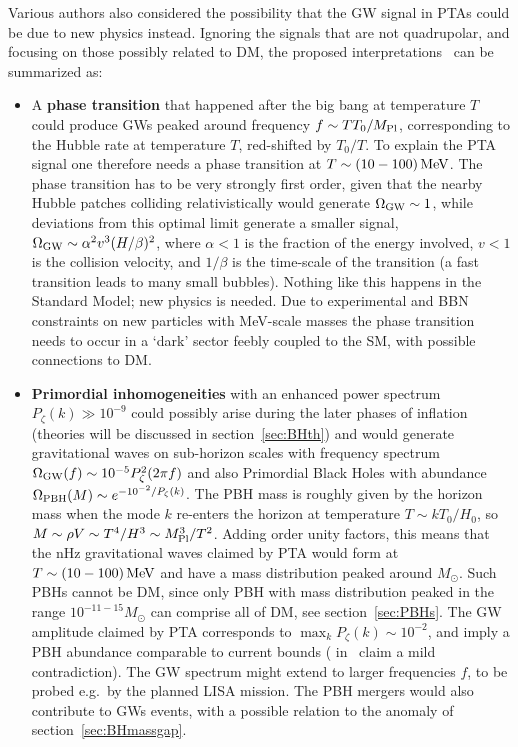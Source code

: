 Various authors also considered the possibility that  the GW signal in PTAs could be due to new physics instead.
Ignoring the signals that are not quadrupolar, and focusing on those possibly related to DM,
the proposed interpretations~\cite{NANOGrav:explanations} can be summarized as:
\begin{itemize}
\item[$\circ$] A {\bf phase transition} that happened after the big bang at temperature $T$
could produce GWs peaked around frequency $f \sim T T_0/M_{\rm Pl}$, corresponding to the
Hubble rate at temperature $T$, red-shifted by $T_0/T$. To explain the PTA  signal
one therefore needs a phase transition at $T \sim (10-100)\,{\rm MeV}$. 
The phase transition has to be very strongly first order,
given that the nearby Hubble patches colliding relativistically would generate
$\Omega_{\rm GW}\sim 1$, while deviations from this optimal limit generate a smaller signal, 
$\Omega_{\rm GW}\sim \alpha^2 v^3 (H/\beta)^2$,
where $\alpha<1$ is the fraction of the energy involved, $v<1$ is the collision velocity, and $1/\beta$ is the time-scale of the transition
(a fast transition leads to many small bubbles).
Nothing like this happens in the Standard Model; new physics is needed. 
Due to experimental and BBN constraints on new particles with MeV-scale masses
the phase transition needs to occur in a `dark' sector feebly coupled to the SM,
with possible connections to DM. 

\item[$\circ$]
{\bf Primordial inhomogeneities} with an enhanced power spectrum
$P_\zeta(k)\gg 10^{-9}$
could possibly arise during the later phases of inflation
(theories will be discussed in section~\ref{sec:BHth})
and would generate gravitational waves on sub-horizon scales with frequency spectrum
$\Omega_{\rm GW}(f) \sim 10^{-5} P_\zeta^2(2\pi f)$
and also Primordial Black Holes with abundance
$\Omega_{\rm PBH}(M) \sim e^{-10^{-2}/P_\zeta(k)}$.
The PBH mass is roughly given by the horizon mass when the mode $k$ re-enters the horizon
at temperature $T\sim k T_0 /H_0$, so
$M \sim \rho V \sim T^4 /H^3 \sim M_{\rm Pl}^3/T^2$. 
Adding order unity factors,
this means that the nHz gravitational waves claimed by PTA would
form at $T \sim (10-100)\,{\rm MeV}$ and
have a mass distribution peaked around $M_\odot$.
Such PBHs cannot be DM, since only PBH with mass distribution peaked in the range $10^{-11-15} M_\odot$ 
can comprise all of DM, see section~\ref{sec:PBHs}.
The GW amplitude claimed by PTA corresponds to $\max_ k P_\zeta(k) \sim 10^{-2}$,
and imply a PBH abundance comparable to current bounds
( in~\cite{NANOGrav:explanations}
claim a mild contradiction).
The GW spectrum might extend to larger frequencies $f$,
to be probed e.g.\ by the planned LISA mission. 
The PBH mergers would also contribute to GWs events,
with a possible relation to the anomaly of section~\ref{sec:BHmassgap}.





\end{itemize}

